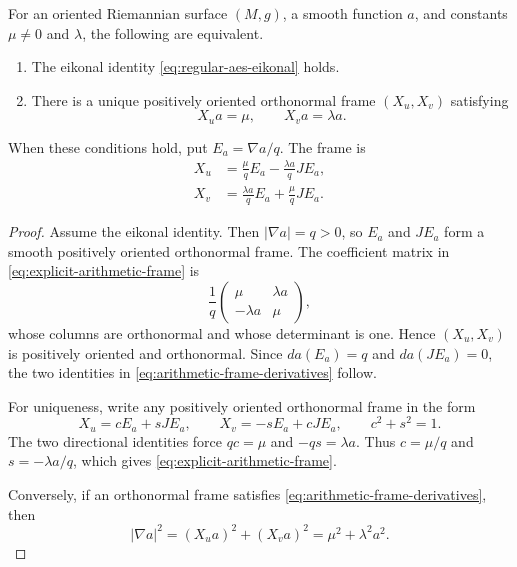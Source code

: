 \begin{proposition}\label{prop:canonical-arithmetic-frame}
For an oriented Riemannian surface \((M,g)\), a smooth function \(a\), and
constants \(\mu\ne0\) and \(\lambda\), the following are equivalent.
\begin{enumerate}
\item The eikonal identity \eqref{eq:regular-aes-eikonal} holds.
\item There is a unique positively oriented orthonormal frame
      \((X_u,X_v)\) satisfying
      \begin{equation}\label{eq:arithmetic-frame-derivatives}
       X_u a=\mu,
       \qquad
       X_v a=\lambda a.
      \end{equation}
\end{enumerate}
When these conditions hold, put \(E_a=\nabla a/q\).  The frame is
\begin{equation}\label{eq:explicit-arithmetic-frame}
 \boxed{
 \begin{aligned}
 X_u&=\frac{\mu}{q}E_a-\frac{\lambda a}{q}J E_a,\\
 X_v&=\frac{\lambda a}{q}E_a+\frac{\mu}{q}J E_a.
 \end{aligned}}
\end{equation}
\end{proposition}

\begin{proof}
Assume the eikonal identity.  Then \(|\nabla a|=q>0\), so \(E_a\) and
\(JE_a\) form a smooth positively oriented orthonormal frame.  The coefficient
matrix in \eqref{eq:explicit-arithmetic-frame} is
\[
 \frac1q
 \begin{pmatrix}
  \mu&\lambda a\\
  -\lambda a&\mu
 \end{pmatrix},
\]
whose columns are orthonormal and whose determinant is one.  Hence
\((X_u,X_v)\) is positively oriented and orthonormal.  Since
\(da(E_a)=q\) and \(da(JE_a)=0\), the two identities in
\eqref{eq:arithmetic-frame-derivatives} follow.

For uniqueness, write any positively oriented orthonormal frame in the form
\[
 X_u=cE_a+sJE_a,
 \qquad
 X_v=-sE_a+cJE_a,
 \qquad c^2+s^2=1.
\]
The two directional identities force \(qc=\mu\) and \(-qs=\lambda a\).
Thus \(c=\mu/q\) and \(s=-\lambda a/q\), which gives
\eqref{eq:explicit-arithmetic-frame}.

Conversely, if an orthonormal frame satisfies
\eqref{eq:arithmetic-frame-derivatives}, then
\[
 |\nabla a|^2=(X_u a)^2+(X_v a)^2
 =\mu^2+\lambda^2a^2.
\]
\end{proof}

